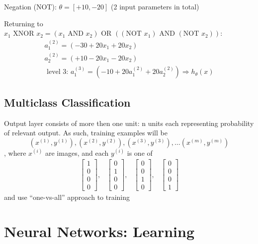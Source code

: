 \documentclass{scrartcl}
\begin{document}
Negation (NOT): $ \theta = [+10, -20]$ (2 input parameters in total)

Returning to $x_1 \textrm{ XNOR } x_2 = (x_1 \textrm{ AND } x_2)
\textrm{ OR } ((\textrm{NOT } x_1) \textrm{ AND } (\textrm{NOT }
x_2))$:
\[
\begin{array}{l}
  a_1^{(2)} = (-30 + 20 x_1 + 20 x_2) \\  
  a_2^{(2)} = (+10 - 20 x_1 - 20 x_2)  \\
  \textrm{ level 3: } a_1^{(3)} = (-10 + 20 a_1^{(2)} + 20 a_2^{(2)})
  \Rightarrow h_\theta(x)
\end{array}
\]
\label{8-6}

\subsection{Multiclass Classification}
\label{sec:8-7}
Output layer consists of more then one unit: n units each representing
probability of relevant output. As such, training examples will
be \[(x^{(1)}, y^{(1)}), (x^{(2)}, y^{(2)}), (x^{(3)}, y^{(3)}), \dots
(x^{(m)}, y^{(m)}) \], where $x^{(i)}$ are images, and each $y^{(i)}$
is one of \[ \begin{array}{cccc} \left[ \begin{array}{c} 1 \\ 0 \\ 0
      \\ 0 \end{array} \right], & \left[ \begin{array}{c} 0 \\ 1 \\ 0
      \\ 0 \end{array} \right], & \left[ \begin{array}{c} 0 \\ 0 \\ 1
      \\ 0 \end{array} \right], & \left[ \begin{array}{c} 0 \\ 0 \\ 0
      \\ 1 \end{array} \right]
\end{array}\]
and use ``one-vs-all'' approach to training


\section{Neural Networks: Learning}
\label {sec:9}
\end{document}
